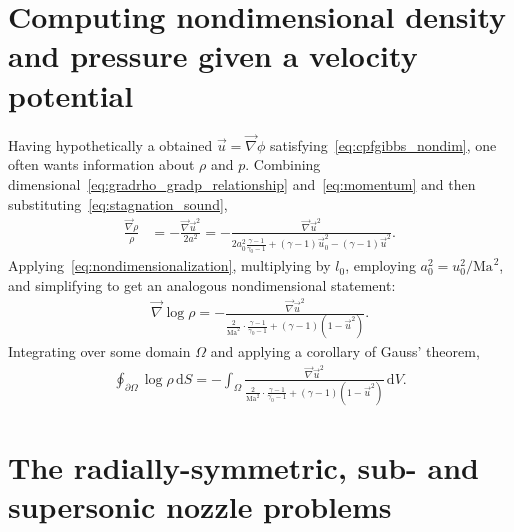 \documentclass[letterpaper,11pt,nointlimits,reqno]{amsart}
\newcommand{\Mach}[1][]{\ensuremath{\mbox{Ma}_{#1}}}
\begin{document}
\section{Computing nondimensional density and pressure given a velocity potential}

Having hypothetically a obtained $\vec{u}=\vec{\nabla}\phi$
satisfying~\eqref{eq:cpfgibbs_nondim}, one often wants information about $\rho$
and $p$.  Combining dimensional~\eqref{eq:gradrho_gradp_relationship}
and~\eqref{eq:momentum} and then substituting~\eqref{eq:stagnation_sound},
\begin{align}
  \frac{\vec{\nabla}\rho}{\rho}
  &=
  - \frac{\vec{\nabla}\vec{u}^2}{2a^2}
  =
  - \frac{\vec{\nabla}\vec{u}^2}{
       2a_0^2 \frac{\gamma-1}{\gamma_0-1}
     + \left(\gamma-1\right)\vec{u}_0^2
     - \left(\gamma-1\right)\vec{u}^2
  }
.
\end{align}
Applying~\eqref{eq:nondimensionalization}, multiplying by $l_0$, employing
$a_0^2 = u_0^2/\Mach^2$, and simplifying to get an analogous nondimensional
statement:
\begin{align}
  \vec{\nabla}\log\rho
  =
  - \frac{\vec{\nabla}\vec{u}^2}{
       \frac{2}{\Mach^2}\cdot\frac{\gamma-1}{\gamma_0-1}
     + \left(\gamma-1\right)\left(1-\vec{u}^2\right)
  }
.
\end{align}
Integrating over some domain $\Omega$ and applying a corollary of Gauss' theorem,
\begin{align}
  \oint_{\partial\Omega} \log\rho \, \mathrm{d}S
  =
  - \int_{\Omega}
  \frac{\vec{\nabla}\vec{u}^2}{
       \frac{2}{\Mach^2}\cdot\frac{\gamma-1}{\gamma_0-1}
     + \left(\gamma-1\right)\left(1-\vec{u}^2\right)
  }
  \, \mathrm{d}V
.
\end{align}

\section{The radially-symmetric, sub- and supersonic nozzle problems}
\end{document}
